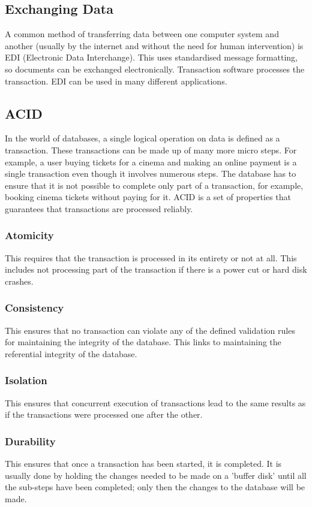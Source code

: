 \documentclass[a4paper,11pt, twocolumn]{article}
\begin{document}
\subsection{Exchanging Data}
A common method of transferring data between one computer system and another (usually by the internet and without the need for human intervention) is EDI (Electronic Data Interchange). This uses standardised message formatting, so documents can be exchanged electronically. Transaction software processes the transaction. EDI can be used in many different applications.
\subsection{ACID}
In the world of databases, a single logical operation on data is defined as a transaction. These transactions can be made up of many more micro steps. For example, a user buying tickets for a cinema and making an online payment is a single transaction even though it involves numerous steps. The database has to ensure that it is not possible to complete only part of a transaction, for example, booking cinema tickets without paying for it. ACID is a set of properties that guarantees that transactions are processed reliably.
\subsubsection{Atomicity}
This requires that the transaction is processed in its entirety or not at all. This includes not processing part of the transaction if there is a power cut or hard disk crashes.
\subsubsection{Consistency}
This ensures that no transaction can violate any of the defined validation rules for maintaining the integrity of the database. This links to maintaining the referential integrity of the database.
\subsubsection{Isolation}
This ensures that concurrent execution of transactions lead to the same results as if the transactions were processed one after the other.
\subsubsection{Durability}
This ensures that once a transaction has been started, it is completed. It is usually done by holding the changes needed to be made on a 'buffer disk' until all the sub-steps have been completed; only then the changes to the database will be made. 
\end{document}
